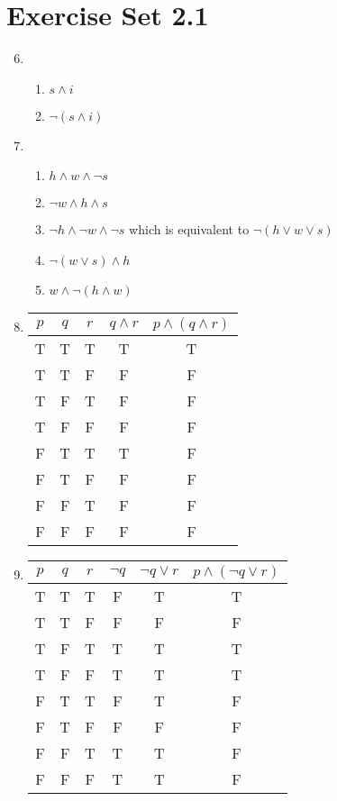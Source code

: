 \documentclass[12pt]{article}
\begin{document}
\section*{Exercise Set 2.1}
\begin{enumerate}
  \setcounter{enumi}{5}
\item %
  \begin{enumerate}
  \item $s \wedge i$
  \item $\lnot (s \wedge i)$
  \end{enumerate}

  \setcounter{enumi}{7}
\item
  \begin{enumerate}
  \item $h \wedge w \wedge \lnot s$
  \item $\lnot w \wedge h \wedge s $
  \item $ \lnot h \wedge \lnot w \wedge \lnot s $ which is equivalent to $ \lnot (h
    \vee w \vee s)$
  \item $ \lnot ( w \vee s) \wedge h $
  \item $ w \wedge \lnot (h \wedge w)$
  \end{enumerate}
\setcounter{enumi}{13}
\item

\begin{tabular} {|c|c|c||c|c|}
\hline
$p$ & $q$ & $r$ & $q \wedge r$ & $p \wedge (q \wedge r)$\\ \hline
T & T & T & T & T\\
T & T & F & F & F\\
T & F & T & F & F\\
T & F & F & F & F\\ 
F & T & T & T & F\\
F & T & F & F & F\\
F & F & T & F & F\\
F & F & F & F & F\\ \hline
\end{tabular}

\item 
\begin{tabular} {|c|c|c||c|c|c|}
\hline
$p$ & $q$ & $r$ & $\neg q$ & $\neg q \vee r$ & $p \wedge (\neg q \vee r)$\\ \hline
T & T & T & F & T & T\\
T & T & F & F & F & F\\
T & F & T & T & T & T\\
T & F & F & T & T & T\\ 
F & T & T & F & T & F\\
F & T & F & F & F & F\\
F & F & T & T & T & F\\
F & F & F & T & T & F\\ \hline
\end{tabular}


\end{enumerate}
\end{document}
